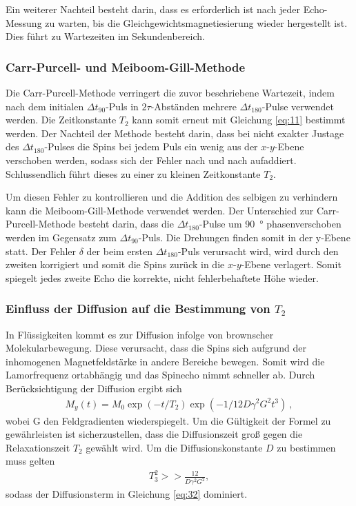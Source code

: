 Ein weiterer Nachteil besteht darin, dass es erforderlich ist nach jeder Echo-Messung zu warten, bis die Gleichgewichtsmagnetiesierung wieder hergestellt ist. Dies führt zu Wartezeiten im Sekundenbereich.

\subsubsection{Carr-Purcell- und Meiboom-Gill-Methode}
Die Carr-Purcell-Methode verringert die zuvor beschriebene Wartezeit, indem nach dem initialen $\Delta t_{90}$-Puls in $2\tau$-Abständen mehrere $\Delta t_{180}$-Pulse verwendet werden. Die Zeitkonstante $T_2$ kann somit erneut mit Gleichung \eqref{eq:11} bestimmt werden. Der Nachteil der Methode besteht darin, dass bei nicht exakter Justage des $\Delta t_{180}$-Pulses die Spins bei jedem Puls ein wenig aus der $x$-$y$-Ebene verschoben werden, sodass sich der Fehler nach und nach aufaddiert. Schlussendlich führt dieses zu einer zu kleinen Zeitkonstante $T_2$.

Um diesen Fehler zu kontrollieren und die Addition des selbigen zu verhindern kann die Meiboom-Gill-Methode verwendet werden. Der Unterschied zur Carr-Purcell-Methode besteht darin, dass die $\Delta t_{180}$-Pulse um \SI{90}{\degree} phasenverschoben werden im Gegensatz zum $\Delta t_{90}$-Puls. Die Drehungen finden somit in der y-Ebene statt. Der Fehler $\delta$ der beim ersten $\Delta t_{180}$-Puls verursacht wird, wird durch den zweiten korrigiert und somit die Spins zurück in die $x$-$y$-Ebene verlagert. Somit spiegelt jedes zweite Echo die korrekte, nicht fehlerbehaftete Höhe wieder.

\subsubsection{Einfluss der Diffusion auf die Bestimmung von $T_2$}
In Flüssigkeiten kommt es zur Diffusion infolge von brownscher Molekularbewegung. Diese verursacht, dass die Spins sich aufgrund der inhomogenen Magnetfeldstärke in andere Bereiche bewegen. Somit wird die Lamorfrequenz ortabhängig und das Spinecho nimmt schneller ab. Durch Berücksichtigung der Diffusion ergibt sich
\begin{align}
	M_y(t)=M_0\exp{(-t/T_2)}\exp{(-1/12D\gamma^2G^2t^3)} \:,
	\label{eq:32}
\end{align}
wobei G den Feldgradienten wiederspiegelt. Um die Gültigkeit der Formel zu gewährleisten ist sicherzustellen, dass die Diffusionszeit groß gegen die Relaxationszeit $T_2$ gewählt wird. Um die Diffusionskonstante $D$ zu bestimmen muss gelten
\begin{align}
	T_3^2 >>\frac{12}{D\gamma^2G^2},
	\label{eq:34_1}
\end{align}
sodass der Diffusionsterm in Gleichung \eqref{eq:32} dominiert.

